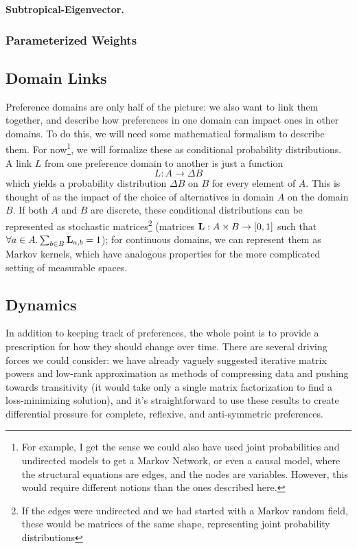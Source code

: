 \documentclass{article}
\begin{document}
	\textbf{Subtropical-Eigenvector.} \cite{elsner2004max}\cite{elsner2010max}
	
	\subsubsection{Parameterized Weights}
	
	\subsection{Domain Links}
	Preference domains are only half of the picture: we also want to link them together, and describe how preferences in one domain can impact ones in other domains. To do this, we will need some mathematical formalism to describe them. For now\footnote{For example, I get the sense we could also have used joint probabilities and undirected models to get a Markov Network, or even a causal model, where the structural equations are edges, and the nodes are variables. However, this would require different notions than the ones described here.}, we will formalize these as conditional probability distributions. A link $L$ from one preference domain to another is just a function 
	\[ L : A \to \Delta B \]
	which yields a probability distribution $\Delta B$ on $B$ for every element of $A$. This is thought of as the impact of the choice of alternatives in domain $A$ on the domain $B$. If both $A$ and $B$ are discrete, these conditional distributions can be represented as stochastic matrices\footnote{If the edges were undirected and we had started with a Markov random field, these would be matrices of the same shape, representing joint probability distributions} (matrices $\mathbf L : A \times B \to [0,1]$ such that $\forall a \in A. \sum_{b \in B} \mathbf L_{a, b} = 1$); for continuous domains, we can represent them as Markov kernels, which have analogous properties for the more complicated setting of measurable spaces.
	
	\subsection{Dynamics}
	In addition to keeping track of preferences, the whole point is to provide a prescription for how they should change over time. There are several driving forces we could consider: we have already vaguely suggested iterative matrix powers and low-rank approximation as methods of compressing data and pushing towards transitivity (it would take only a single matrix factorization to find a loss-minimizing solution), and it's straightforward to use these results to create differential pressure for complete, reflexive, and anti-symmetric preferences. 
	
\end{document}
